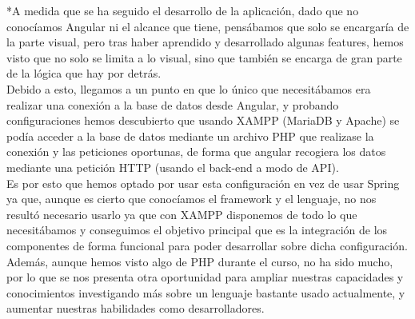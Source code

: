 \begin{itemize}
\begin{itemize}
		\pagebreak
		
		*A medida que se ha seguido el desarrollo de la aplicación, dado que no conocíamos Angular ni el alcance que tiene, pensábamos que solo se encargaría de la parte visual, pero tras haber aprendido y desarrollado algunas features, hemos visto que no solo se limita a lo visual, sino que también se encarga de gran parte de la lógica que hay por detrás.\\
		
		Debido a esto, llegamos a un punto en que lo único que necesitábamos era realizar una conexión a la base de datos desde Angular, y probando configuraciones hemos descubierto que usando XAMPP (MariaDB y Apache) se podía acceder a la base de datos mediante un archivo PHP que realizase la conexión y las peticiones oportunas, de forma que angular recogiera los datos mediante una petición HTTP (usando el back-end a modo de API).\\
		
		Es por esto que hemos optado por usar esta configuración en vez de usar Spring ya que, aunque es cierto que conocíamos el framework y el lenguaje, no nos resultó necesario usarlo ya que con XAMPP disponemos de todo lo que necesitábamos y conseguimos el objetivo principal que es la integración de los componentes de forma funcional para poder desarrollar sobre dicha configuración.\\
		
		Además, aunque hemos visto algo de PHP durante el curso, no ha sido mucho, por lo que se nos presenta otra oportunidad para ampliar nuestras capacidades y conocimientos investigando más sobre un lenguaje bastante usado actualmente, y aumentar nuestras habilidades como desarrolladores.\\
		
	\end{itemize}
\end{itemize}






	